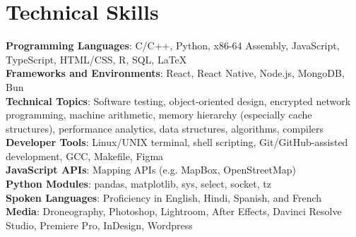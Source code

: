\documentclass[letterpaper,11pt]{article}
\begin{document}
\section{Technical Skills}
 \begin{itemize}[leftmargin=0in, label={}]
    \small{\item{
     \textbf{Programming Languages}{: C/C++, Python, x86-64 Assembly, JavaScript, TypeScript, HTML/CSS, R, SQL, \LaTeX} \\
     \textbf{Frameworks and Environments}{: React, React Native, Node.js, MongoDB, Bun} \\
     \textbf{Technical Topics}{: Software testing, object-oriented design,
     encrypted network programming, machine arithmetic, memory hierarchy
     (especially cache structures), performance analytics, data structures,
     algorithms, compilers} \\
     \textbf{Developer Tools}{: Linux/UNIX terminal, shell scripting,
     Git/GitHub-assisted development, GCC, Makefile, Figma} \\
     \textbf{JavaScript APIs}{: Mapping APIs (e.g. MapBox, OpenStreetMap)} \\
     \textbf{Python Modules}{: pandas, matplotlib, sys, select, socket, tz}\\
     \textbf{Spoken Languages}{: Proficiency in English, Hindi, Spanish, and French} \\
     \textbf{Media}{: Droneography, Photoshop, Lightroom, After Effects, Davinci Resolve Studio, Premiere Pro, InDesign, Wordpress} \\
     
    }}
 \end{itemize}
\end{document}
